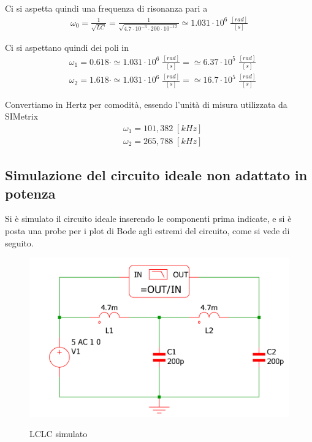 \documentclass[a4paper,12pt]{report}
\begin{document}
Ci si aspetta quindi una frequenza di risonanza pari a
\begin{align}
\omega_0 = \frac{1}{\sqrt{LC}} = \frac{1}{\sqrt{4.7 \cdot 10^{-3} \cdot 200 \cdot 10^{-12}}} \simeq 1.031 \cdot 10^6 \; \frac{[rad]}{[s]}
\end{align}


Ci si aspettano quindi dei poli in
\begin{align}
&\omega_1 = 0.618 \cdot \simeq 1.031 \cdot 10^6 \; \frac{[rad]}{[s]} = \simeq 6.37 \cdot 10^5 \; \frac{[rad]}{[s]}\\
&\omega_2 = 1.618 \cdot \simeq 1.031 \cdot 10^6 \; \frac{[rad]}{[s]} = \simeq 16.7 \cdot 10^5 \; \frac{[rad]}{[s]}
\end{align}

Convertiamo in Hertz per comodità, essendo l'unità di misura utilizzata da SIMetrix
\begin{align}
&\omega_1 = 101,382 \; [kHz]\\
&\omega_2 = 265,788 \; [kHz]
\end{align}

\newpage

\subsection{Simulazione del circuito ideale non adattato in potenza}

Si è simulato il circuito ideale inserendo le componenti prima indicate, e si è posta una probe per i plot di Bode agli estremi del circuito, come si vede di seguito.
\begin{figure}[!htb]
	\centering
	\includegraphics[width=\textwidth]{pictures/schemaideale_vero.png}
	\label{fig:largenenough}
	\caption{\label{lul} \small LCLC simulato}
\end{figure}
\end{document}
